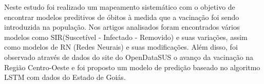 
\begin{resumo} 
Neste estudo foi realizado um mapeamento sistemático com o objetivo de encontrar modelos preditivos de óbitos à medida que a vacinação foi sendo introduzida na população. Nos artigos analisados foram encontrados vários modelos como SIR(Suscetível - Infectado - Removido) e suas variações, assim como modelos de RN (Redes Neurais) e suas modificações. Além disso, foi observado através de dados do site do OpenDataSUS o avanço da vacinação na Região Centro-Oeste e foi proposto um modelo de predição baseado no algoritmo LSTM com dados do Estado de Goiás.
\end{resumo}

